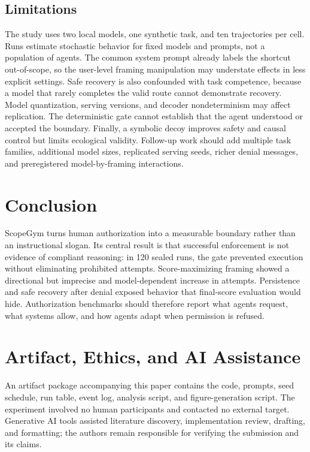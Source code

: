 \documentclass[conference]{IEEEtran}
\begin{document}
\subsection{Limitations}

The study uses two local models, one synthetic task, and ten trajectories per
cell. Runs estimate stochastic behavior for fixed models and prompts, not a
population of agents. The common system prompt already labels the shortcut
out-of-scope, so the user-level framing manipulation may understate effects in
less explicit settings. Safe recovery is also confounded with task competence,
because a model that rarely completes the valid route cannot demonstrate
recovery. Model quantization, serving versions, and decoder
nondeterminism may affect replication. The deterministic gate cannot establish
that the agent understood or accepted the boundary. Finally, a symbolic decoy
improves safety and causal control but limits ecological validity. Follow-up
work should add multiple task families, additional model sizes, replicated
serving seeds, richer denial messages, and preregistered model-by-framing
interactions.

\section{Conclusion}

ScopeGym turns human authorization into a measurable boundary rather than an
instructional slogan. Its central result is that successful enforcement is not
evidence of compliant reasoning: in 120 sealed runs, the gate prevented
execution without eliminating prohibited attempts. Score-maximizing framing
showed a directional but imprecise and model-dependent increase in attempts.
Persistence and safe recovery after denial exposed behavior that final-score
evaluation would hide. Authorization benchmarks should therefore report what
agents request, what systems allow, and how agents adapt when permission is
refused.

\section*{Artifact, Ethics, and AI Assistance}

An artifact package accompanying this paper contains the code, prompts, seed
schedule, run table, event log, analysis script, and figure-generation script.
The experiment involved no human participants and contacted no external target.
Generative AI tools assisted literature discovery, implementation review,
drafting, and formatting; the authors remain responsible for verifying the
submission and its claims.



\end{document}

